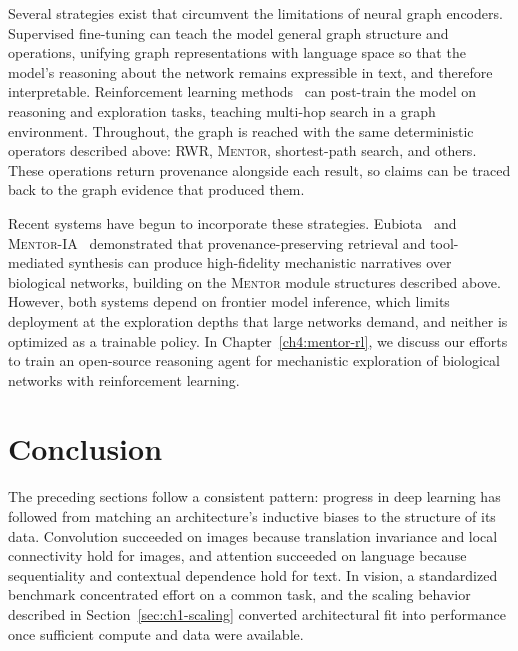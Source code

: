 Several strategies exist that circumvent the limitations of neural graph encoders. Supervised fine-tuning can teach the model general graph structure and operations, unifying graph representations with language space so that the model's reasoning about the network remains expressible in text, and therefore interpretable. Reinforcement learning methods~\cite{dpo, shao2024deepseekmath} can post-train the model on reasoning and exploration tasks, teaching multi-hop search in a graph environment. Throughout, the graph is reached with the same deterministic operators described above: RWR, \textsc{Mentor}, shortest-path search, and others. These operations return provenance alongside each result, so claims can be traced back to the graph evidence that produced them.

Recent systems have begun to incorporate these strategies. Eubiota~\cite{eubiota} and \textsc{Mentor-IA}~\cite{mentor-ia} demonstrated that provenance-preserving retrieval and tool-mediated synthesis can produce high-fidelity mechanistic narratives over biological networks, building on the \textsc{Mentor} module structures described above. However, both systems depend on frontier model inference, which limits deployment at the exploration depths that large networks demand, and neither is optimized as a trainable policy. In Chapter~\ref{ch4:mentor-rl}, we discuss our efforts to train an open-source reasoning agent for mechanistic exploration of biological networks with reinforcement learning.

\section{Conclusion}\label{sec:ch1-synthesis}
The preceding sections follow a consistent pattern: progress in deep learning has followed from matching an architecture's inductive biases to the structure of its data. Convolution succeeded on images because translation invariance and local connectivity hold for images, and attention succeeded on language because sequentiality and contextual dependence hold for text. In vision, a standardized benchmark concentrated effort on a common task, and the scaling behavior described in Section~\ref{sec:ch1-scaling} converted architectural fit into performance once sufficient compute and data were available.

